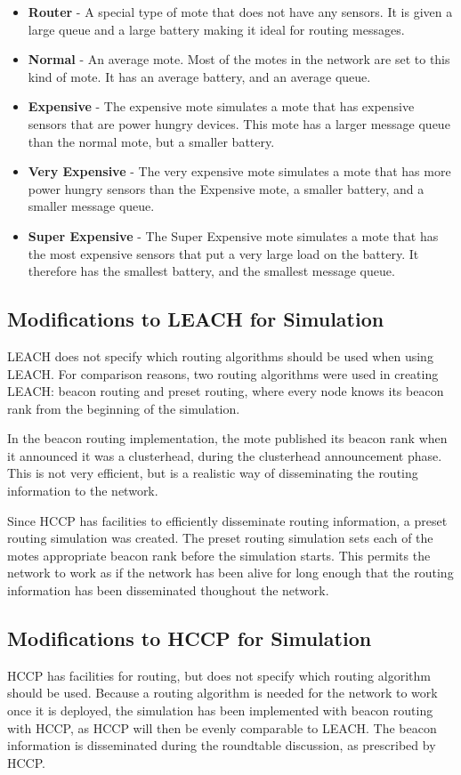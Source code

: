 \begin{itemize}
    \item \textbf{Router} - A special type of mote that does not have any sensors. It is given a large queue and a large battery making it ideal for routing messages.
    \item \textbf{Normal} - An average mote. Most of the motes in the network are set to this kind of mote. It has an average battery, and an average queue.
    \item \textbf{Expensive} - The expensive mote simulates a mote that has expensive sensors that are power hungry devices. This mote has a larger message queue than the normal mote, but a smaller battery.
    \item \textbf{Very Expensive} - The very expensive mote simulates a mote that has more power hungry sensors than the Expensive mote,  a smaller battery, and a smaller message queue.
    \item \textbf{Super Expensive} - The Super Expensive mote simulates a mote that has the most expensive sensors that put a very large load on the battery. It therefore has the smallest battery, and the smallest message queue.
\end{itemize}

\subsection{Modifications to LEACH for Simulation}
LEACH does not specify which routing algorithms should be used when using LEACH.
For comparison reasons, two routing algorithms were used in creating LEACH: beacon routing 
and 
preset routing, where every node knows its beacon rank from the beginning of the simulation.

In the beacon routing implementation, the mote published its beacon rank when it announced 
it was a clusterhead, during the clusterhead announcement phase. This is not very efficient, but is
a realistic way
of disseminating the routing information to the network.

Since HCCP has facilities to efficiently disseminate routing information, a preset routing simulation was created. The
preset routing simulation sets each of the motes appropriate beacon rank before the simulation starts. This permits the network to work
as if the network has been alive for long enough that the routing information has been disseminated thoughout the network.


\subsection{Modifications to HCCP for Simulation}
HCCP has facilities for routing, but does not specify which routing algorithm should be used. 
Because a routing algorithm is needed for the network to work once it is deployed, the simulation has 
been implemented with beacon routing with HCCP, as HCCP will then be evenly comparable to LEACH. 
The beacon information is disseminated during the roundtable
discussion, as prescribed by HCCP.

